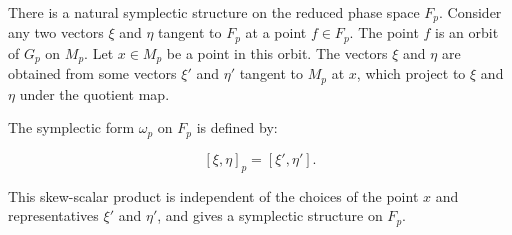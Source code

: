 There is a natural symplectic structure on the reduced phase space $F_p$. Consider any two vectors $\xi$ and $\eta$ tangent to $F_p$ at a point $f \in F_p$. The point $f$ is an orbit of $G_p$ on $M_p$. Let $x \in M_p$ be a point in this orbit. The vectors $\xi$ and $\eta$ are obtained from some vectors $\xi'$ and $\eta'$ tangent to $M_p$ at $x$, which project to $\xi$ and $\eta$ under the quotient map.

The symplectic form $\omega_p$ on $F_p$ is defined by:

$$[\xi, \eta]_p = [\xi', \eta'].$$

This skew-scalar product is independent of the choices of the point $x$ and representatives $\xi'$ and $\eta'$, and gives a symplectic structure on $F_p$.
